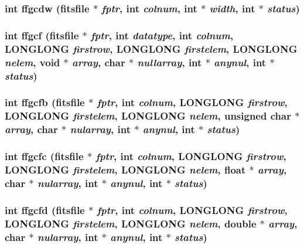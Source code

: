 \subsubsection{\setlength{\rightskip}{0pt plus 5cm}int ffgcdw (\bf{fitsfile} $\ast$ {\em fptr}, int {\em colnum}, int $\ast$ {\em width}, int $\ast$ {\em status})}\label{fitsio_8h_ae9a8c205e4900ba5d06b4ea71a5ed2e}


\subsubsection{\setlength{\rightskip}{0pt plus 5cm}int ffgcf (\bf{fitsfile} $\ast$ {\em fptr}, int {\em datatype}, int {\em colnum}, \bf{LONGLONG} {\em firstrow}, \bf{LONGLONG} {\em firstelem}, \bf{LONGLONG} {\em nelem}, void $\ast$ {\em array}, char $\ast$ {\em nullarray}, int $\ast$ {\em anynul}, int $\ast$ {\em status})}\label{fitsio_8h_8bad8cda622bdd1ba30e3f5adcb1077f}


\subsubsection{\setlength{\rightskip}{0pt plus 5cm}int ffgcfb (\bf{fitsfile} $\ast$ {\em fptr}, int {\em colnum}, \bf{LONGLONG} {\em firstrow}, \bf{LONGLONG} {\em firstelem}, \bf{LONGLONG} {\em nelem}, unsigned char $\ast$ {\em array}, char $\ast$ {\em nularray}, int $\ast$ {\em anynul}, int $\ast$ {\em status})}\label{fitsio_8h_bd592166bad248d7ca43c0e8e77b1596}


\subsubsection{\setlength{\rightskip}{0pt plus 5cm}int ffgcfc (\bf{fitsfile} $\ast$ {\em fptr}, int {\em colnum}, \bf{LONGLONG} {\em firstrow}, \bf{LONGLONG} {\em firstelem}, \bf{LONGLONG} {\em nelem}, float $\ast$ {\em array}, char $\ast$ {\em nularray}, int $\ast$ {\em anynul}, int $\ast$ {\em status})}\label{fitsio_8h_6dee15a7ea96a9b97cb01f09f0cc789e}


\subsubsection{\setlength{\rightskip}{0pt plus 5cm}int ffgcfd (\bf{fitsfile} $\ast$ {\em fptr}, int {\em colnum}, \bf{LONGLONG} {\em firstrow}, \bf{LONGLONG} {\em firstelem}, \bf{LONGLONG} {\em nelem}, double $\ast$ {\em array}, char $\ast$ {\em nularray}, int $\ast$ {\em anynul}, int $\ast$ {\em status})}\label{fitsio_8h_c923b88cae018d17ab73f2bea102040c}


